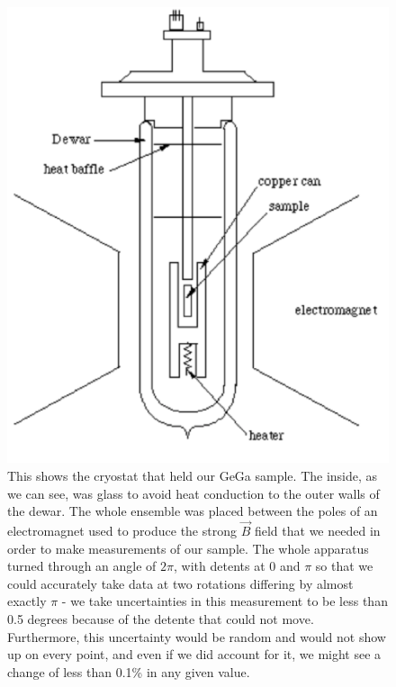 \documentclass[reprint, nobibnotes, amssymb, amsmath, amsfonts, physics, mathtools, mathrsfs, floatfix]{revtex4-1}
\begin{document}
\begin{widetext}
      \begin{figure}[h]
        \centering
        \includegraphics[width=\linewidth]{dewar.png}
        \caption{This shows the cryostat that held our GeGa sample.  The inside, as we can see, was glass to avoid heat conduction to the outer walls of the dewar.  The whole ensemble was placed between the poles of an electromagnet used to produce the strong $\vec{B}$ field that we needed in order to make measurements of our sample.  The whole apparatus turned through an angle of $2\pi$, with detents at $0$ and $\pi$ so that we could accurately take data at two rotations differing by almost exactly $\pi$ - we take uncertainties in this measurement to be less than 0.5 degrees because of the detente that could not move.  Furthermore, this uncertainty would be random and would not show up on every point, and even if we did account for it, we might see a change of less than 0.1\% in any given value.~\label{dewar}~\cite{lab_manual}}
      \end{figure}


\end{widetext}
\end{document}
